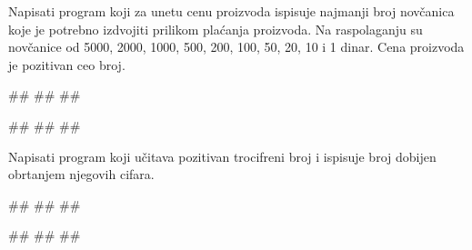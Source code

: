\begin{Exercise}[label=UZ_NI_11] 
Napisati program koji za unetu cenu proizvoda ispisuje najmanji broj novčanica koje je potrebno izdvojiti
prilikom plaćanja proizvoda. Na raspolaganju su novčanice od 5000, 2000, 1000, 500, 200, 100, 50, 20, 10 i 1 dinar. 
Cena proizvoda je pozitivan ceo broj. 

\begin{maxitest}
\begin{upotreba}{1}
#\naslovInt#
##
##
\end{upotreba}
\begin{upotreba}{2}
#\naslovInt#
##
##
\end{upotreba}
\end{maxitest}
\end{Exercise}
\ifresenja
\begin{Answer}[ref=UZ_NI_11]
\end{Answer}
\fi

\begin{Exercise}[label=UZ_NI_12] 
Napisati program koji učitava pozitivan trocifreni broj i ispisuje broj dobijen obrtanjem njegovih cifara. 

\begin{miditest}
\begin{upotreba}{1}
#\naslovInt#
##
##
\end{upotreba}
\end{miditest}
\begin{miditest}
\begin{upotreba}{2}
#\naslovInt#
##
##
\end{upotreba}
\end{miditest}


\end{Exercise}
\ifresenja
\begin{Answer}[ref=UZ_NI_12]
\end{Answer}
\fi


